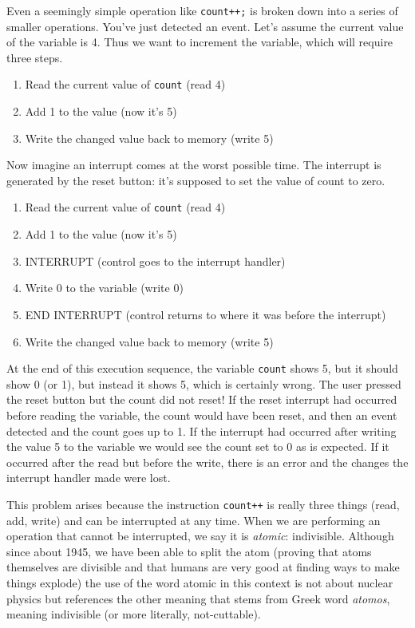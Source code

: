 Even a seemingly simple operation like \texttt{count++;} is broken down into a series of smaller operations. You've just detected an event. Let's assume the current value of the variable is 4. Thus we want to increment the variable, which will require three steps.

\begin{enumerate}
	\item Read the current value of \texttt{count} (read 4)
	\item Add 1 to the value (now it's 5)
	\item Write the changed value back to memory (write 5)
\end{enumerate}

Now imagine an interrupt comes at the worst possible time. The interrupt is generated by the reset button: it's supposed to set the value of count to zero.

\begin{enumerate}
	\item Read the current value of \texttt{count} (read 4)
	\item Add 1 to the value (now it's 5)
	\item INTERRUPT (control goes to the interrupt handler)
	\item Write 0 to the variable (write 0)
	\item END INTERRUPT (control returns to where it was before the interrupt)
	\item Write the changed value back to memory (write 5)
\end{enumerate}

At the end of this execution sequence, the variable \texttt{count} shows 5, but it should show 0 (or 1), but instead it shows 5, which is certainly wrong. The user pressed the reset button but the count did not reset! If the reset interrupt had occurred before reading the variable, the count would have been reset, and then an event detected and the count goes up to 1. If the interrupt had occurred after writing the value 5 to the variable we would see the count set to 0 as is expected. If it occurred after the read but before the write, there is an error and the changes the interrupt handler made were lost.

This problem arises because the instruction \texttt{count++} is really three things (read, add, write) and can be interrupted at any time. When we are performing an operation that cannot be interrupted, we say it is \textit{atomic}: indivisible. Although since about 1945, we have been able to split the atom (proving that atoms themselves are divisible and that humans are very good at finding ways to make things explode) the use of the word atomic in this context is not about nuclear physics but references the other meaning that stems from Greek word \textit{atomos}, meaning indivisible (or more literally, not-cuttable). 

